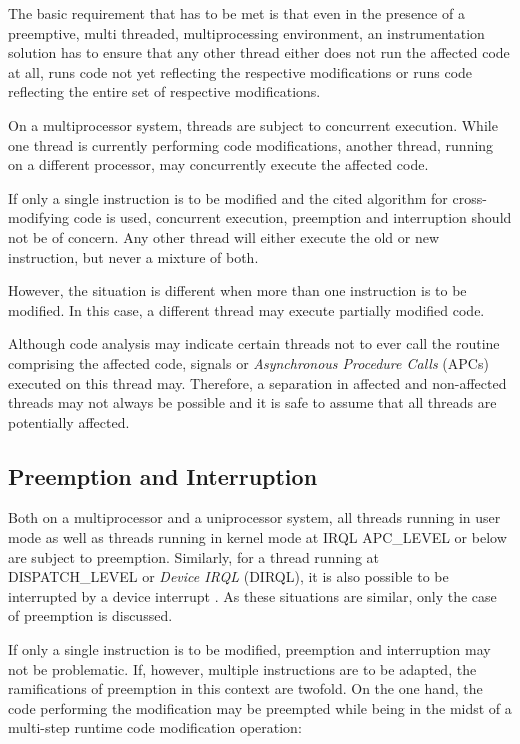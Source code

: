 The basic requirement that has to be met is that even 
in the presence of a preemptive, multi threaded, multiprocessing environment,
an instrumentation solution has to ensure that any other thread either does not run 
the affected code at all, runs code not yet reflecting the respective modifications 
or runs code reflecting the entire set of respective modifications. 

On a multiprocessor system, threads are subject to concurrent execution. While one thread
is currently performing code modifications, another thread, running on a different
processor, may concurrently execute the affected code.

If only a single instruction is to be modified and the cited algorithm for cross-modifying
code is used, concurrent execution, preemption and interruption should not be 
of concern. Any other thread will either execute the old or new instruction, 
but never a mixture of both.

However, the situation is different when more than one instruction is to be modified. In 
this case, a different thread may execute partially modified code.

Although code analysis may indicate certain threads
not to ever call the routine comprising the affected code, signals or \emph{Asynchronous Procedure Calls} (APCs) executed on
this thread may. Therefore, a separation in affected and non-affected threads may not
always be possible and it is safe to assume that all threads are potentially affected.

\subsection{Preemption and Interruption}
\label{sec:PreemptionAndInterruption}
Both on a multiprocessor and a uniprocessor system, all threads running in user mode as 
well as threads running in kernel mode at IRQL APC\_LEVEL or below are subject to 
preemption. Similarly, for a thread running at DISPATCH\_LEVEL or \emph{Device IRQL} (DIRQL), it is also possible 
to be interrupted by a device interrupt \cite{WindowsInternals}. As these situations are similar, only the case
of preemption is discussed.

If only a single instruction is to be modified, preemption and interruption may not
be problematic. If, however, multiple instructions are to be adapted, the ramifications 
of preemption in this context are twofold. On the one hand, the code performing the 
modification may be preempted while being in the midst of a multi-step runtime code 
modification operation:

